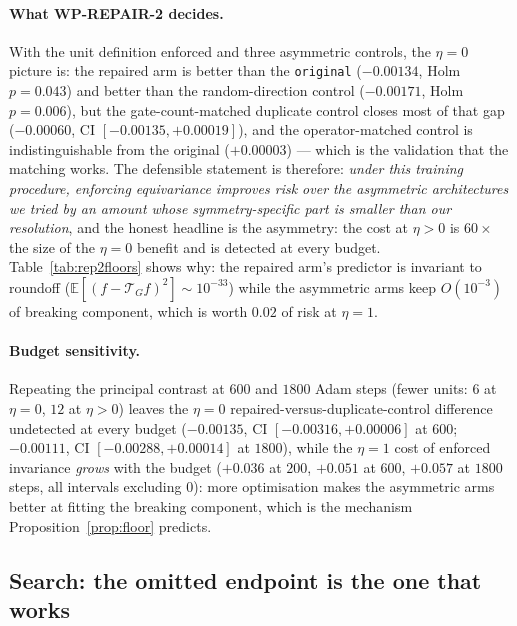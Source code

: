 \documentclass{neurips_2024}
\newcommand{\Tg}{\mathcal{T}_G}
\begin{document}
\paragraph{What WP-REPAIR-2 decides.} With the unit definition enforced and three asymmetric
controls, the $\eta{=}0$ picture is: the repaired arm is better than the
\texttt{original} ($-0.00134$, Holm $p{=}0.043$) and better than the random-direction control
($-0.00171$, Holm $p{=}0.006$), but the gate-count-matched duplicate control closes most of
that gap ($-0.00060$, CI $[-0.00135,+0.00019]$), and the operator-matched control is
indistinguishable from the original ($+0.00003$) --- which is the validation that the
matching works. The defensible statement is therefore: \emph{under this training procedure,
enforcing equivariance improves risk over the asymmetric architectures we tried by an amount
whose symmetry-specific part is smaller than our resolution}, and the honest headline is the
asymmetry: the cost at $\eta{>}0$ is $60\times$ the size of the $\eta{=}0$ benefit and is
detected at every budget. Table~\ref{tab:rep2floors} shows why: the repaired arm's predictor
is invariant to roundoff ($\mathbb{E}[(f-\Tg f)^2]\sim10^{-33}$) while the asymmetric arms
keep $O(10^{-3})$ of breaking component, which is worth $0.02$ of risk at $\eta{=}1$.

\paragraph{Budget sensitivity.} Repeating the principal contrast at $600$ and $1800$
Adam steps (fewer units: $6$ at $\eta{=}0$, $12$ at $\eta{>}0$) leaves the $\eta{=}0$
repaired-versus-duplicate-control difference undetected at every budget
($-0.00135$, CI $[-0.00316,+0.00006]$ at $600$; $-0.00111$, CI $[-0.00288,+0.00014]$ at
$1800$), while the $\eta{=}1$ cost of enforced invariance \emph{grows} with the budget
($+0.036$ at $200$, $+0.051$ at $600$, $+0.057$ at $1800$ steps, all intervals excluding
$0$): more optimisation makes the asymmetric arms better at fitting the breaking component,
which is the mechanism Proposition~\ref{prop:floor} predicts.

\subsection{Search: the omitted endpoint is the one that works}
\label{sec:search-results}
\end{document}
